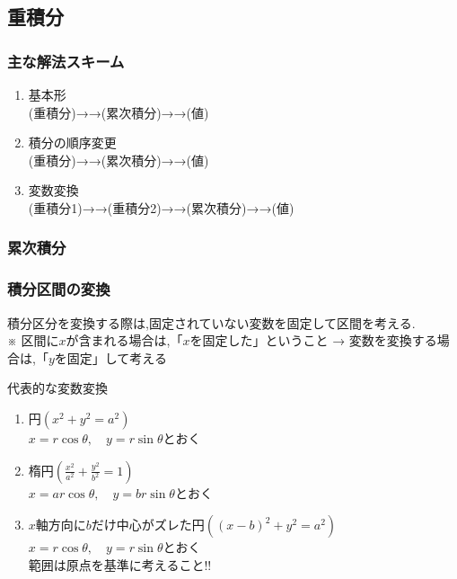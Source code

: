 \documentclass[a4paper]{jsarticle}
\begin{document}
\subsection{重積分}
\subsubsection{主な解法スキーム}
\begin{enumerate}[(1)]
    \item 基本形\\
          (重積分)→→(累次積分)→→(値)
    \item 積分の順序変更\\
          (重積分)→→(累次積分)→→(値)
    \item 変数変換\\
          (重積分1)→→(重積分2)→→(累次積分)→→(値)
\end{enumerate}
\subsubsection{累次積分}

\subsubsection{積分区間の変換}
積分区分を変換する際は,固定されていない変数を固定して区間を考える.\\
※ 区間に$x$が含まれる場合は,「$x$を固定した」ということ → 変数を変換する場合は,「$y$を固定」して考える
\begin{itembox}[l]{代表的な変数変換}
    \begin{enumerate}[(1)]
        \item 円\quad $\left(x^2+y^2=a^2\right)$\\
              $x=r\cos\theta,\quad y=r\sin\theta$とおく
        \item 楕円\quad $\left(\frac{x^2}{a^2}+\frac{y^2}{b^2}=1\right)$\\
              $x=ar\cos\theta,\quad y=br\sin\theta$とおく
        \item $x$軸方向に$b$だけ中心がズレた円\quad $\left(\left(x-b\right)^2+y^2=a^2\right)$\\
              $x=r\cos\theta,\quad y=r\sin\theta$とおく\\
              範囲は原点を基準に考えること!!
    \end{enumerate}
\end{itembox}
\end{document}
